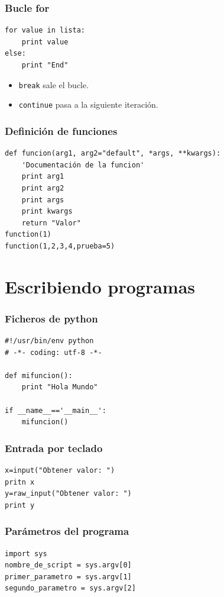 \documentclass[10pt]{beamer}
\begin{document}
  \begin{frame}[containsverbatim]
    \frametitle{Bucle for}
    \begin{verbatim}
for value in lista:
    print value
else:
    print "End"
    \end{verbatim}
    \begin{itemize}
      \item \verb+break+ sale el bucle.
      \item \verb+continue+ pasa a la siguiente iteración.
    \end{itemize}
  \end{frame}

  \begin{frame}[containsverbatim]
    \frametitle{Definición de funciones}
    \begin{verbatim}
def funcion(arg1, arg2="default", *args, **kwargs):
    'Documentación de la funcion'
    print arg1
    print arg2
    print args
    print kwargs
    return "Valor"
function(1)
function(1,2,3,4,prueba=5)
    \end{verbatim}
  \end{frame}

  \section*{Escribiendo programas}

  \begin{frame}[containsverbatim]
    \frametitle{Ficheros de python}
    \begin{verbatim}
#!/usr/bin/env python
# -*- coding: utf-8 -*-

def mifuncion():
    print "Hola Mundo"

if __name__=='__main__':
    mifuncion()
    \end{verbatim}
  \end{frame}

  \begin{frame}[containsverbatim]
    \frametitle{Entrada por teclado}
    \begin{verbatim}
x=input("Obtener valor: ")
pritn x
y=raw_input("Obtener valor: ")
print y
    \end{verbatim}
  \end{frame}

  \begin{frame}[containsverbatim]
    \frametitle{Parámetros del programa}
    \begin{verbatim}
import sys
nombre_de_script = sys.argv[0]
primer_parametro = sys.argv[1]
segundo_parametro = sys.argv[2]
    \end{verbatim}
  \end{frame}
\end{document}
